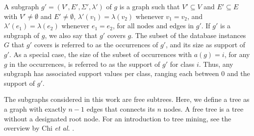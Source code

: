 \documentclass{article}
\begin{document}
A subgraph $g'=(V',E',\Sigma',\lambda')$ of $g$ is a graph such that $V'
\subseteq V$ and $E' \subseteq E$ with $V' \ne \emptyset$ and $E' \ne
\emptyset$, $\lambda'(v_1)=\lambda(v_2)$ whenever $v_1=v_2$, and
$\lambda'(e_1)=\lambda(e_2)$ whenever $e_1=e_2$, for all nodes and edges in
$g'$.  If $g'$ is a subgraph of $g$, we also say that $g'$ covers $g$.  The
subset of the database instances $G$ that $g'$ covers is referred to as the
occurrences of $g'$, and its size as support of $g'$.  As a special case, the
size of the subset of occurrences with $a(g)=i$, for any $g$ in the
occurrences, is referred to as the support of $g'$ for class $i$. Thus, any
subgraph has associated support values per class, ranging each between 0 and
the support of $g'$.

The subgraphs considered in this work are free subtrees. Here, we define a tree
as a graph with exactly $n-1$ edges that connects its $n$ nodes. A free tree is
a tree without a designated root node. For an introduction to tree mining, see
the overview by Chi \emph{et al.} \cite{CMNK01Frequent}.
\end{document}
